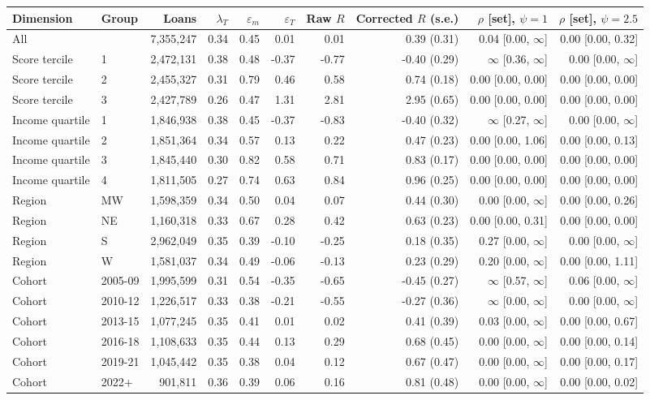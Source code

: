 \begin{tabular}{llrrrrrrrr}
\toprule
Dimension & Group & Loans & $\lambda_T$ & $\varepsilon_m$ & $\varepsilon_T$ & Raw $R$ & Corrected $R$ (s.e.) & $\rho$ [set], $\psi = 1$ & $\rho$ [set], $\psi = 2.5$ \\
\midrule
All &  & 7,355,247 & 0.34 & 0.45 & 0.01 & 0.01 & 0.39 (0.31) & 0.04 [0.00, $\infty$] & 0.00 [0.00, 0.32] \\
Score tercile & 1 & 2,472,131 & 0.38 & 0.48 & -0.37 & -0.77 & -0.40 (0.29) & $\infty$ [0.36, $\infty$] & 0.00 [0.00, $\infty$] \\
Score tercile & 2 & 2,455,327 & 0.31 & 0.79 & 0.46 & 0.58 & 0.74 (0.18) & 0.00 [0.00, 0.00] & 0.00 [0.00, 0.00] \\
Score tercile & 3 & 2,427,789 & 0.26 & 0.47 & 1.31 & 2.81 & 2.95 (0.65) & 0.00 [0.00, 0.00] & 0.00 [0.00, 0.00] \\
Income quartile & 1 & 1,846,938 & 0.38 & 0.45 & -0.37 & -0.83 & -0.40 (0.32) & $\infty$ [0.27, $\infty$] & 0.00 [0.00, $\infty$] \\
Income quartile & 2 & 1,851,364 & 0.34 & 0.57 & 0.13 & 0.22 & 0.47 (0.23) & 0.00 [0.00, 1.06] & 0.00 [0.00, 0.13] \\
Income quartile & 3 & 1,845,440 & 0.30 & 0.82 & 0.58 & 0.71 & 0.83 (0.17) & 0.00 [0.00, 0.00] & 0.00 [0.00, 0.00] \\
Income quartile & 4 & 1,811,505 & 0.27 & 0.74 & 0.63 & 0.84 & 0.96 (0.25) & 0.00 [0.00, 0.00] & 0.00 [0.00, 0.00] \\
Region & MW & 1,598,359 & 0.34 & 0.50 & 0.04 & 0.07 & 0.44 (0.30) & 0.00 [0.00, $\infty$] & 0.00 [0.00, 0.26] \\
Region & NE & 1,160,318 & 0.33 & 0.67 & 0.28 & 0.42 & 0.63 (0.23) & 0.00 [0.00, 0.31] & 0.00 [0.00, 0.00] \\
Region & S & 2,962,049 & 0.35 & 0.39 & -0.10 & -0.25 & 0.18 (0.35) & 0.27 [0.00, $\infty$] & 0.00 [0.00, $\infty$] \\
Region & W & 1,581,037 & 0.34 & 0.49 & -0.06 & -0.13 & 0.23 (0.29) & 0.20 [0.00, $\infty$] & 0.00 [0.00, 1.11] \\
Cohort & 2005-09 & 1,995,599 & 0.31 & 0.54 & -0.35 & -0.65 & -0.45 (0.27) & $\infty$ [0.57, $\infty$] & 0.06 [0.00, $\infty$] \\
Cohort & 2010-12 & 1,226,517 & 0.33 & 0.38 & -0.21 & -0.55 & -0.27 (0.36) & $\infty$ [0.00, $\infty$] & 0.00 [0.00, $\infty$] \\
Cohort & 2013-15 & 1,077,245 & 0.35 & 0.41 & 0.01 & 0.02 & 0.41 (0.39) & 0.03 [0.00, $\infty$] & 0.00 [0.00, 0.67] \\
Cohort & 2016-18 & 1,108,633 & 0.35 & 0.44 & 0.13 & 0.29 & 0.68 (0.45) & 0.00 [0.00, $\infty$] & 0.00 [0.00, 0.14] \\
Cohort & 2019-21 & 1,045,442 & 0.35 & 0.38 & 0.04 & 0.12 & 0.67 (0.47) & 0.00 [0.00, $\infty$] & 0.00 [0.00, 0.17] \\
Cohort & 2022+ & 901,811 & 0.36 & 0.39 & 0.06 & 0.16 & 0.81 (0.48) & 0.00 [0.00, $\infty$] & 0.00 [0.00, 0.02] \\
\bottomrule
\end{tabular}
